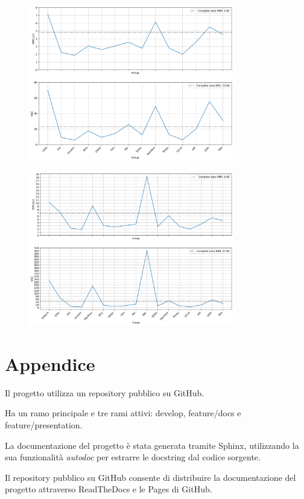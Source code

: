 \documentclass[10pt]{article}
\begin{document}
\begin{figure}
	\includegraphics[width=0.8\textwidth]{result_without_out.png}
\end{figure}
\begin{figure}
	\includegraphics[width=0.8\textwidth]{result_without_out_overall.png}
\end{figure}






\section*{Appendice}

Il progetto utilizza un repository pubblico su GitHub. 

Ha un ramo principale e tre rami attivi: develop, feature/docs e feature/presentation.




La documentazione del progetto è stata generata tramite Sphinx, utilizzando la sua funzionalità \emph{autodoc} per estrarre le docstring dal codice sorgente.

Il repository pubblico su GitHub consente di distribuire la documentazione del progetto attraverso ReadTheDocs e le Pages di GitHub.
\end{document}
